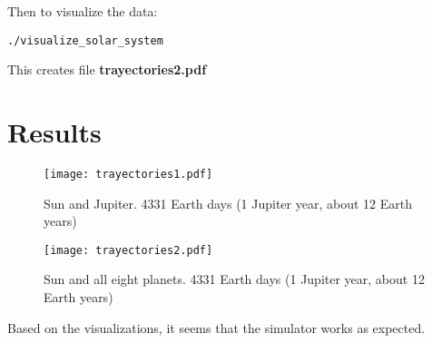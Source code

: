 \documentclass[12pt]{scrartcl}
\begin{document}
Then to visualize the data:
\begin{verbatim}
./visualize_solar_system
\end{verbatim}

This creates file \textbf{trayectories2.pdf}

\section*{Results}

\begin{figure}
    \texttt{[image: trayectories1.pdf]}
    \caption{Sun and Jupiter. 4331 Earth days (1 Jupiter year, about 12 Earth years)}
\end{figure}

\begin{figure}
    \texttt{[image: trayectories2.pdf]}
    \caption{Sun and all eight planets. 4331 Earth days (1 Jupiter year, about 12 Earth years)}
\end{figure}

Based on the visualizations, it seems that the simulator works as expected.
\end{document}
